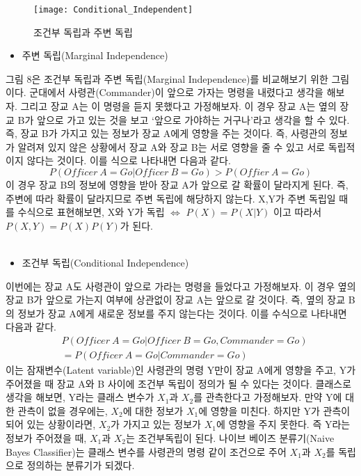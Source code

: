 \documentclass[a4paper]{oblivoir}
\begin{document}
\begin{figure}[ht]\centering
\texttt{[image: Conditional\_Independent]}\caption{조건부 독립과 주변 독립}\label{Fig:3-8}
\end{figure}
\begin{itemize}\setlength\itemsep{-\parsep}
	\item 주변 독립(Marginal Independence)
\end{itemize}
\indent 그림 8은 조건부 독립과 주변 독립(Marginal Independence)를 비교해보기 위한 그림이다. 군대에서 사령관(Commander)이 앞으로 가자는 명령을 내렸다고 생각을 해보자. 그리고 장교 A는 이 명령을 듣지 못했다고 가정해보자. 이 경우 장교 A는 옆의 장교 B가 앞으로 가고 있는 것을 보고 `앞으로 가야하는 거구나'라고 생각을 할 수 있다. 즉, 장교 B가 가지고 있는 정보가 장교 A에게 영향을 주는 것이다. 즉, 사령관의 정보가 알려져 있지 않은 상황에서 장교 A와 장교 B는 서로 영향을 줄 수 있고 서로 독립적이지 않다는 것이다. 이를 식으로 나타내면 다음과 같다.
\begin{equation}
P(Officer\ A=Go|Officer\ B=Go) > P(Offier\ A=Go)
\end{equation}
이 경우 장교 B의 정보에 영향을 받아 장교 A가 앞으로 갈 확률이 달라지게 된다. 즉, 주변에 따라 확률이 달라지므로 주변 독립에 해당하지 않는다. X,Y가 주변 독립일 때를 수식으로 표현해보면, X와 Y가 독립 $\Leftrightarrow$ $P(X)=P(X|Y)$ 이고 따라서 $P(X,Y)=P(X)P(Y)$가 된다.\\\\
\begin{itemize}\setlength\itemsep{-\parsep}
	\item 조건부 독립(Conditional Independence)
\end{itemize}
\indent 이번에는 장교 A도 사령관이 앞으로 가라는 명령을 들었다고 가정해보자. 이 경우 옆의 장교 B가 앞으로 가는지 여부에 상관없이 장교 A는 앞으로 갈 것이다. 즉, 옆의 장교 B의 정보가 장교 A에게 새로운 정보를 주지 않는다는 것이다. 이를 수식으로 나타내면 다음과 같다.
\begin{equation}
\begin{split}
&P(Officer\ A=Go|Officer\ B=Go,Commander=Go)\\
&=P(Officer\ A=Go|Commander=Go)
\end{split}
\end{equation}
이는 잠재변수(Latent variable)인 사령관의 명령 Y만이 장교 A에게 영향을 주고, Y가 주어졌을 때 장교 A와 B 사이에 조건부 독립이 정의가 될 수 있다는 것이다. 클래스로 생각을 해보면, Y라는 클래스 변수가 $X_1$과 $X_2$를 관측한다고 가정해보자. 만약 Y에 대한 관측이 없을 경우에는, $X_2$에 대한 정보가 $X_1$에 영향을 미친다. 하지만 Y가 관측이 되어 있는 상황이라면, $X_2$가 가지고 있는 정보가 $X_1$에 영향을 주지 못한다. 즉 Y라는 정보가 주어졌을 때, $X_1$과 $X_2$는 조건부독립이 된다. 나이브 베이즈 분류기(Naive Bayes Classifier)는 클래스 변수를 사령관의 명령 같이 조건으로 주어 $X_1$과 $X_2$를 독립으로 정의하는 분류기가 되겠다.\\\\
\end{document}
